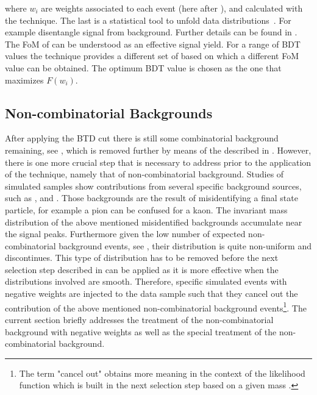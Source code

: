 \noindent where $w_i$ are weights associated to each event (here after \sWeights), and calculated with the \sPlot
technique. The last  is a statistical tool to unfold data distributions~\cite{splot}. For example disentangle signal from background.
Further details can be found in . The FoM of  can be understood as an effective signal yield.
For a range of BDT values the \sPlot technique provides a different set of \sWeights based on which a different FoM value can be obtained.
The optimum BDT value is chosen as the one that maximizes $F(w_i)$.

\subsection{Non-combinatorial Backgrounds}
\label{peaking_backgrounds}

After applying the BTD cut there is still some combinatorial background remaining, see , which is removed
further by means of the \sWeights described in . However, there is
one more crucial step that is necessary to address prior to the application of the \sPlot technique,
namely that of non-combinatorial background. Studies of simulated samples show contributions from
several specific background sources, such as \BsJpsiKK, \BsJpsipipi and \BdJpsipipi.
Those backgrounds are the result of misidentifying a final state particle, for example a pion can
be confused for a kaon. The invariant mass distribution of the above mentioned misidentified backgrounds
accumulate near the \BJpsiKpi signal peaks. Furthermore given the low number of expected non-combinatorial background events,
see , their distribution is quite non-uniform and discontinues. This type of distribution has to be removed
before the next selection step described in  can be applied as it is more effective
when the distributions involved are smooth. Therefore, specific simulated events with negative weights
are injected to the data sample such that they cancel out the contribution of the above mentioned non-combinatorial background
events\footnote{The term "cancel out" obtains more meaning in the context of the likelihood function which is built in
the next selection step  based on a given mass \pdf. }.
The current section briefly addresses the treatment of the non-combinatorial background with negative weights
as well as the special treatment of the \LbJpsippi non-combinatorial background.

